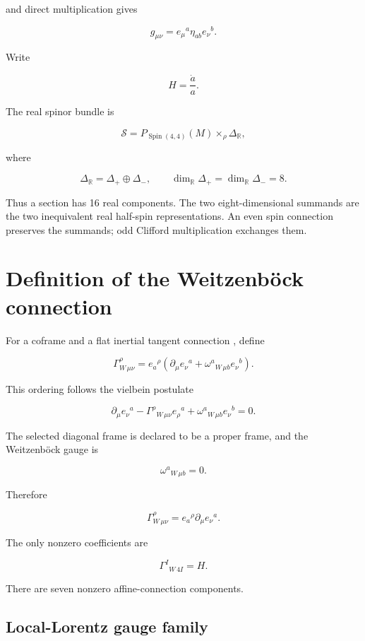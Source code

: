 \documentclass[11pt]{article}
\begin{document}
and direct multiplication gives

\[
g_{\mu\nu}=e_\mu{}^a\eta_{ab}e_\nu{}^b.
\]

Write

\[
H=\frac{\dot a}{a}.
\]

The real spinor bundle is

\[
\mathcal S=P_{\operatorname{Spin}(4,4)}(M)
\mathbin{\times}_\rho\Delta_{\mathbb R},
\]

where

\[
\Delta_{\mathbb R}=\Delta_+\oplus\Delta_-,
\qquad \dim_{\mathbb R}\Delta_+=\dim_{\mathbb R}\Delta_-=8.
\]

Thus a section \texttt{} has 16 real components. The two eight-dimensional summands are the two inequivalent real half-spin representations. An even spin connection preserves the summands; odd Clifford multiplication exchanges them.

\section{Definition of the Weitzenböck connection}

For a coframe \texttt{} and a flat inertial tangent connection \texttt{}, define

\[
\boxed{
\Gamma^{\rho}_{W\,\mu\nu}
=e_a{}^\rho\left(
\partial_\mu e_\nu{}^a
+\omega^a{}_{W\,\mu b}e_\nu{}^b
\right).}
\]

This ordering follows the vielbein postulate

\[
\partial_\mu e_\nu{}^a
-\Gamma^\rho{}_{W\,\mu\nu}e_\rho{}^a
+\omega^a{}_{W\,\mu b}e_\nu{}^b=0.
\]

The selected diagonal frame is declared to be a proper frame, and the Weitzenböck gauge is

\[
\boxed{\omega^a{}_{W\,\mu b}=0.}
\]

Therefore

\[
\boxed{
\Gamma^{\rho}_{W\,\mu\nu}
=e_a{}^\rho\partial_\mu e_\nu{}^a.}
\]

The only nonzero coefficients are

\[
\Gamma^I{}_{W\,4I}=H.
\]

There are seven nonzero affine-connection components.

\subsection{Local-Lorentz gauge family}
\end{document}
